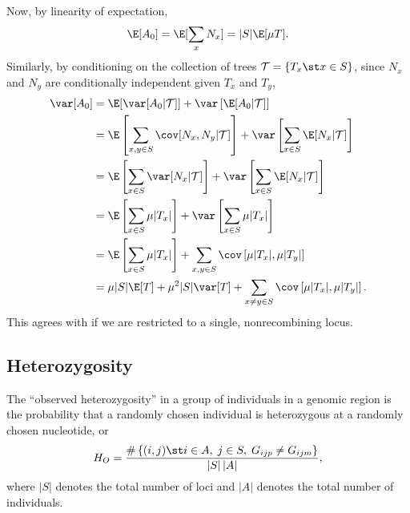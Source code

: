 Now, by linearity of expectation,
\begin{align}
  \E[A_0] = \E[ \sum_x N_x] = |S| \E[\mu T] .
\end{align}
Similarly, by conditioning on the collection of trees $\mathcal{T} = \{ T_x \st x \in S\}$,
since $N_x$ and $N_y$ are conditionally independent given $T_x$ and $T_y$,
\begin{align}
  \var[A_0] &= \E[ \var[A_0 | \mathcal{T} ] ] + \var\left[ \E[ A_0 | \mathcal{T} ] \right] \\
  &= \E \left[ \sum_{x,y\in S} \cov[N_x,N_y|\mathcal{T}] \right] + \var\left[ \sum_{x \in S} \E[ N_x | \mathcal{T} ] \right] \\
  &= \E \left[ \sum_{x\in S} \var[N_x|\mathcal{T}] \right] + \var\left[ \sum_{x \in S} \E[ N_x | \mathcal{T} ] \right] \\
  &= \E \left[ \sum_{x \in S} \mu |T_x| \right] + \var\left[ \sum_{x \in S} \mu |T_x| \right] \\
  &= \E \left[ \sum_{x \in S} \mu |T_x| \right] + \sum_{x,y \in S} \cov\left[ \mu |T_x|, \mu |T_y| \right] \\
  &= \mu |S| \E [ T ] + \mu^2 |S| \var[T] + \sum_{x \neq y \in S} \cov\left[ \mu |T_x|, \mu |T_y| \right] .
\end{align}
This agrees with \citet{hudson1990gene} if we are restricted to a single, nonrecombining locus.


\subsection{Heterozygosity} 

The ``observed heterozygosity'' in a group of individuals in a genomic region 
is the probability that a randomly chosen individual is heterozygous at a randomly chosen nucleotide,
or 
\begin{align}
  H_O = \frac{ \# \left\{ (i,j) \st i \in A, \; j \in S, \; G_{ijp} \neq G_{ijm} \right\} }{ |S|\,|A| } ,
\end{align}
where $|S|$ denotes the total number of loci and $|A|$ denotes the total number of individuals.


